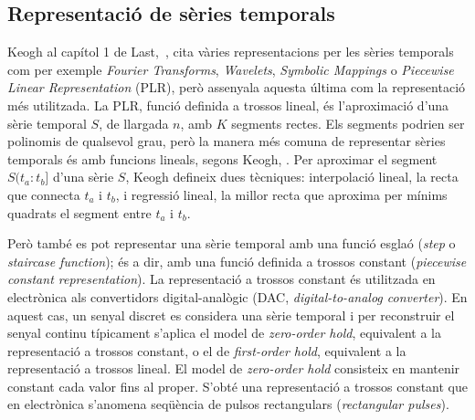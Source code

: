 

\subsection{Representació de sèries temporals}

Keogh al capítol 1 de Last,~\cite{last}, cita vàries representacions per les sèries temporals com per exemple \emph{Fourier Transforms}, \emph{Wavelets}, \emph{Symbolic Mappings} o \emph{Piecewise Linear Representation} (PLR), però assenyala aquesta última com la representació més utilitzada. 
La PLR, funció definida a trossos lineal, és l'aproximació d'una sèrie temporal $S$, de llargada $n$, amb $K$ segments rectes. Els segments podrien ser polinomis de qualsevol grau, però la manera més comuna de representar sèries temporals és amb funcions lineals, segons Keogh, \cite{keogh02}.
Per aproximar el segment $S(t_a:t_b]$ d'una sèrie $S$, Keogh defineix dues tècniques: interpolació lineal, la recta que connecta $t_a$ i $t_b$, i regressió lineal, la millor recta que aproxima per mínims quadrats el segment entre $t_a$ i $t_b$.

Però també es pot representar una sèrie temporal amb una funció esglaó (\emph{step} o \emph{staircase function}); és a dir, amb una funció definida a trossos constant (\emph{piecewise constant representation}).
La representació a trossos constant és utilitzada en electrònica als convertidors digital-analògic (DAC, \emph{digital-to-analog converter}). En aquest cas, un senyal discret es considera una sèrie temporal i per reconstruir el senyal continu típicament s'aplica el model de \emph{zero-order hold}, equivalent a la representació a trossos constant,  o el de \emph{first-order hold},  equivalent a la representació a trossos lineal.
El model de \emph{zero-order hold} consisteix en mantenir constant cada valor fins al proper. S'obté una representació a trossos constant que en electrònica s'anomena seqüència de pulsos rectangulars (\emph{rectangular pulses}).

